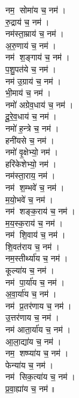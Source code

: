 \begin{multicols}{2}
\begin{flushleft}
नम॒ सोमा॑य च॒ नम॑।\\
रु॒द्राय॑ च॒ नम॑।\\
नम॑स्ता॒म्राय॑ च॒ नम॑।\\
अ॒रु॒णाय॑ च॒ नम॑।\\
नम॑ श॒ङ्गाय॑ च॒ नम॑।\\
प॒शु॒पत॑ये च॒ नम॑।\\
नम॑ उ॒ग्राय॑ च॒ नम॑।\\
भी॒माय॑ च॒ नम॑।\hfill {}\\
नमो॑ अग्रेव॒धाय॑ च॒ नम॑।\\
दू॒रे॒व॒धाय॑ च॒ नम॑।\\
नमो॑ ह॒न्त्रे च॒ नम॑।\\
हनी॑यसे च॒ नम॑।\\
नमो॑ वृ॒क्षेभ्यो॒ नम॑।\\
हरि॑केशेभ्यो॒ नम॑।\\
नम॑स्ता॒राय॒ नम॑।\\
नम॑ श॒म्भवे॑ च॒ नम॑।\\
म॒यो॒भवे॑ च॒ नम॑।\\
नम॑ शङ्क॒राय॑ च॒ नम॑।\hfill {}\\
म॒य॒स्क॒राय॑ च॒ नम॑।\\
नम॑ शि॒वाय॑  च॒ नम॑।\\
शि॒वत॑राय च॒ नम॑।\\
नम॒स्तीर्थ्या॑य च॒ नम॑।\\
कूल्या॑य च॒ नम॑।\\
नम॑ पा॒र्या॑य च॒ नम॑।\\
अ॒वा॒र्या॑य च॒ नम॑।\\
नम॑ प्र॒तर॑णाय च॒ नम॑।\\
उ॒त्तर॑णाय च॒ नम॑।\\
नम॑ आता॒र्या॑य च॒ नम॑।\hfill {}\\
आ॒ला॒द्या॑य च॒ नम॑।\\
नम॒ शष्प्या॑य च॒ नम॑।\\
फेन्या॑य च॒ नम॑।\\
नम॑ सिक॒त्या॑य च॒ नम॑।\\
प्र॒वा॒ह्या॑य च॒ नम॑॥\\


\end{flushleft}
\end{multicols}
